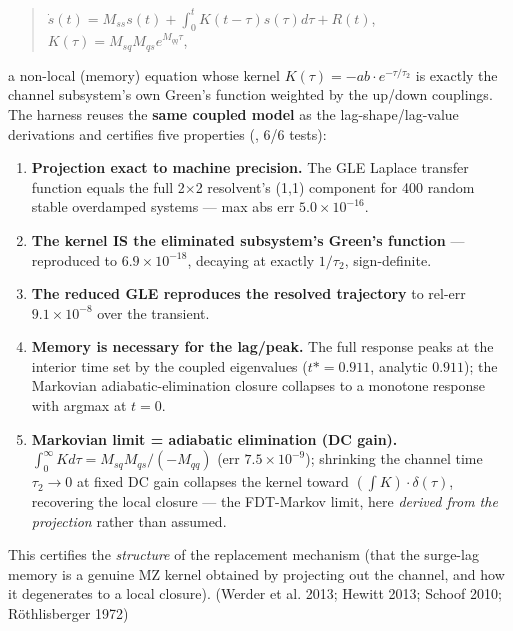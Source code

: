 \documentclass[11pt]{article}
\begin{document}
\begin{quote}
$\dot{s}(t) = M_{ss} s(t) + \int _{0}^{t} K(t-\tau ) s(\tau ) d\tau  + R(t)$, $K(\tau ) = M_{sq} M_{qs} e^{M_{qq} \tau }$,
\end{quote}


a non-local (memory) equation whose kernel $K(\tau )=-ab\cdot e^{-\tau /\tau _{2}}$ is exactly the channel subsystem's own Green's function weighted by the up/down couplings. The harness reuses the \textbf{same coupled model} as the lag-shape/lag-value derivations and certifies five properties (, 6/6 tests):


\begin{enumerate}
\item \textbf{Projection exact to machine precision.} The GLE Laplace transfer function equals the full 2\ensuremath{\times}2 resolvent's (1,1) component for 400 random stable overdamped systems — max abs err \textbf{$5.0\times 10^{-16}$}.
\item \textbf{The kernel IS the eliminated subsystem's Green's function} — reproduced to \textbf{$6.9\times 10^{-18}$}, decaying at exactly $1/\tau _{2}$, sign-definite.
\item \textbf{The reduced GLE reproduces the resolved trajectory} to rel-err \textbf{$9.1\times 10^{-8}$} over the transient.
\item \textbf{Memory is necessary for the lag/peak.} The full response peaks at the interior time set by the coupled eigenvalues ($t*=0.911$, analytic $0.911$); the Markovian adiabatic-elimination closure collapses to a monotone response with argmax at $t=0$.
\item \textbf{Markovian limit = adiabatic elimination (DC gain).} $\int _{0}^\infty  K d\tau  = M_{sq} M_{qs}/(-M_{qq})$ (err $7.5\times 10^{-9}$); shrinking the channel time $\tau _{2}\to 0$ at fixed DC gain collapses the kernel toward $(\int K)\cdot \delta (\tau )$, recovering the local closure — the FDT-Markov limit, here \emph{derived from the projection} rather than assumed.
\end{enumerate}


This certifies the \emph{structure} of the replacement mechanism (that the surge-lag memory is a genuine MZ kernel obtained by projecting out the channel, and how it degenerates to a local closure). (Werder et al. 2013; Hewitt 2013; Schoof 2010; Röthlisberger 1972)
\end{document}
